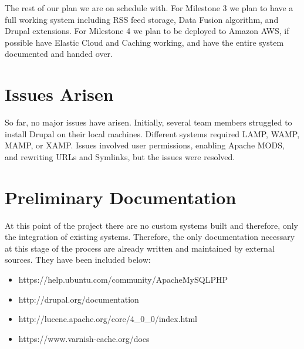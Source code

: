 \documentclass[12pt]{article} %
\begin{document}
The rest of our plan we are on schedule with. For Milestone 3 we plan to have a full working system including RSS feed storage, Data Fusion algorithm, and Drupal extensions. For Milestone 4 we plan to be deployed to Amazon AWS, if possible have Elastic Cloud and Caching working, and have the entire system documented and handed over. 

\section{Issues Arisen}

So far, no major issues have arisen. Initially, several team members struggled to install Drupal on their local machines. Different systems required LAMP, WAMP, MAMP, or XAMP. Issues involved user permissions, enabling Apache MODS, and rewriting URLs and Symlinks, but the issues were resolved.

\section{Preliminary Documentation}

At this point of the project there are no custom systems built and therefore, only the integration of existing systems. Therefore, the only documentation necessary at this stage of the process are already written and maintained by external sources. They have been included below:

\begin{itemize}
\item https://help.ubuntu.com/community/ApacheMySQLPHP
\item http://drupal.org/documentation
\item http://lucene.apache.org/core/4\_0\_0/index.html
\item https://www.varnish-cache.org/docs
\end{itemize}
\end{document}
